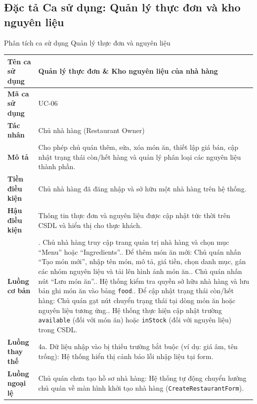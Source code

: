 \documentclass{uetgraduation}
\begin{document}
\subsection{Đặc tả Ca sử dụng: Quản lý thực đơn và kho nguyên liệu}
\begin{table}[!htbp]{Phân tích ca sử dụng Quản lý thực đơn và nguyên liệu}
\centering
\small
\begin{tabularx}{\textwidth}{|l|>{\raggedright\arraybackslash}X|}
\hline
\textbf{Tên ca sử dụng} & \textbf{Quản lý thực đơn \& Kho nguyên liệu của nhà hàng} \\ \hline
\textbf{Mã ca sử dụng} & UC-06 \\ \hline
\textbf{Tác nhân} & Chủ nhà hàng (Restaurant Owner) \\ \hline
\textbf{Mô tả} & Cho phép chủ quán thêm, sửa, xóa món ăn, thiết lập giá bán, cập nhật trạng thái còn/hết hàng và quản lý phân loại các nguyên liệu thành phần. \\ \hline
\textbf{Tiền điều kiện} & Chủ nhà hàng đã đăng nhập và sở hữu một nhà hàng trên hệ thống. \\ \hline
\textbf{Hậu điều kiện} & Thông tin thực đơn và nguyên liệu được cập nhật tức thời trên CSDL và hiển thị cho thực khách. \\ \hline
\textbf{Luồng cơ bản} & 
1. Chủ nhà hàng truy cập trang quản trị nhà hàng và chọn mục ``Menu'' hoặc ``Ingredients''.\newline
2. Để thêm món ăn mới: Chủ quán nhấn ``Tạo món mới'', nhập tên món, mô tả, giá tiền, chọn danh mục, gán các nhóm nguyên liệu và tải lên hình ảnh món ăn.\newline
3. Chủ quán nhấn nút ``Lưu món ăn''.\newline
4. Hệ thống kiểm tra quyền sở hữu nhà hàng và lưu bản ghi món ăn vào bảng \texttt{food}.\newline
5. Để cập nhật trạng thái còn/hết hàng: Chủ quán gạt nút chuyển trạng thái tại dòng món ăn hoặc nguyên liệu tương ứng.\newline
6. Hệ thống thực hiện cập nhật trường \texttt{available} (đối với món ăn) hoặc \texttt{inStock} (đối với nguyên liệu) trong CSDL. \\ \hline
\textbf{Luồng thay thế} & 
4a. Dữ liệu nhập vào bị thiếu trường bắt buộc (ví dụ: giá âm, tên trống): Hệ thống hiển thị cảnh báo lỗi nhập liệu tại form. \\ \hline
\textbf{Luồng ngoại lệ} & 
Chủ quán chưa tạo hồ sơ nhà hàng: Hệ thống tự động chuyển hướng chủ quán về màn hình khởi tạo nhà hàng (\texttt{CreateRestaurantForm}). \\ \hline
\end{tabularx}
\end{table}
\end{document}
